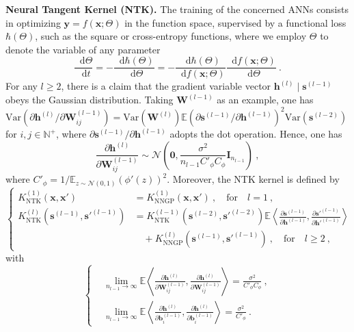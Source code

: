 \documentclass[review,10pt]{JMtemplate}
\newcommand*{\dif}{\mathop{}\!\mathrm{d}}
\begin{document}
\vspace{0.2 cm}
\noindent\textbf{Neural Tangent Kernel (NTK).} The training of the concerned ANNs consists in optimizing $\boldsymbol{y} = f(\boldsymbol{x} ; \Theta)$ in the function space, supervised by a functional loss $\hbar(\Theta)$, such as the square or cross-entropy functions, where we employ $\Theta$ to denote the variable of any parameter
\[
\frac{\dif \Theta}{\dif t} = - \frac{\dif \hbar(\Theta)}{\dif \Theta} = - \frac{\dif \hbar(\Theta)}{\dif f(\boldsymbol{x} ; \Theta)} \frac{\dif f(\boldsymbol{x} ; \Theta)}{\dif \Theta} \ .
\]
For any $l \geq 2$, there is a claim that the gradient variable vector $\boldsymbol{h}^{(l)} \mid \boldsymbol{s}^{(l-1)}$ obeys the Gaussian distribution. Taking $\mathbf{W}^{(l-1)}$ as an example, one has $\textrm{Var} ( {\partial \boldsymbol{h}^{(l)}}/{\partial \mathbf{W}_{ij}^{(l-1)}} ) = \textrm{Var} ( \mathbf{W}^{(l)} ) \mathbb{E} ( {\partial \boldsymbol{s}^{(l-1)}}/{\partial \boldsymbol{h}^{(l-1)}} )^2 \textrm{Var} (  \boldsymbol{s}^{(l-2)} )$ for $i,j \in \mathbb{N}^+$, where ${\partial \boldsymbol{s}^{(l-1)}} / {\partial \boldsymbol{h}^{(l-1)}}$ adopts the dot operation. Hence, one has
\[
\frac{\partial \boldsymbol{h}^{(l)}}{\partial \mathbf{W}_{ij}^{(l-1)}} \sim \mathcal{N} \left(  \boldsymbol{0}, \frac{\sigma^2}{n_{l-1} C'_{\phi} C_{\phi} } \mathbf{I}_{n_{l-1}} \right)  \ ,
\]
where $C'_{\phi} = {1}/{\mathbb{E}_{z \sim \mathcal{N}(0,1)} \left( \phi'(z) \right)^2 } $. Moreover, the NTK kernel is defined by
\[
\left\{ \begin{aligned}
K_{\textrm{NTK}}^{(1)} \left(  \boldsymbol{x}, \boldsymbol{x}' \right)  &= K_{\textrm{NNGP}}^{(1)} \left(  \boldsymbol{x}, \boldsymbol{x}' \right)  \ , \quad\text{for}\quad l = 1 \ ,  \\
K_{\textrm{NTK}}^{(l)} \left(  \boldsymbol{s}^{(l-1)}, \boldsymbol{s}'^{(l-1)} \right)  &= K_{\textrm{NTK}}^{(l-1)} \left(  \boldsymbol{s}^{(l-2)}, \boldsymbol{s}'^{(l-2)} \right) \mathbb{E} \left\langle \frac{\partial \boldsymbol{s}^{(l-1)}}{\partial \boldsymbol{h}^{(l-1)}},  \frac{\partial \boldsymbol{s}'^{(l-1)}}{\partial \boldsymbol{h}'^{(l-1)}} \right\rangle \\
&\quad + K_{\textrm{NNGP}}^{(l)} \left( \boldsymbol{s}^{(l-1)}, \boldsymbol{s}'^{(l-1)} \right) \ ,
\quad\text{for}\quad l \geq 2 \ , 
\end{aligned} \right.
\]
with
\[
\left\{\begin{aligned}
& \lim\limits_{n_{l-1} \to \infty} \mathbb{E} \left\langle \frac{\partial \boldsymbol{h}^{(l)}}{\partial \mathbf{W}_{ij}^{(l-1)}} , \frac{\partial \boldsymbol{h}^{(l)}}{\partial \mathbf{W}_{ij}^{(l-1)}}  \right\rangle  =  \frac{\sigma^2}{C'_{\phi} C_{\phi} } \ , \\
& \lim\limits_{n_{l-1} \to \infty} \mathbb{E} \left\langle \frac{\partial \boldsymbol{h}^{(l)}}{\partial \boldsymbol{b}_i^{(l-1)} } , \frac{\partial \boldsymbol{h}^{(l)}}{\partial \boldsymbol{b}_i^{(l-1)} }  \right\rangle  =  \frac{\sigma^2}{C'_{\phi} } \ .
\end{aligned} \right.
\]
\end{document}
